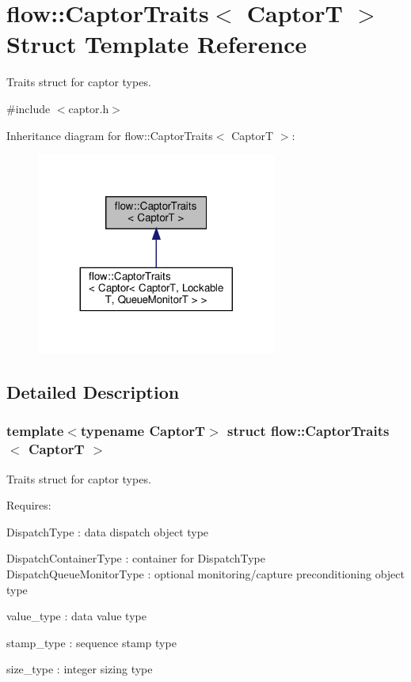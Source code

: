 \hypertarget{structflow_1_1_captor_traits}{}\section{flow\+:\+:Captor\+Traits$<$ CaptorT $>$ Struct Template Reference}
\label{structflow_1_1_captor_traits}


Traits struct for captor types.  




{\ttfamily \#include $<$captor.\+h$>$}



Inheritance diagram for flow\+:\+:Captor\+Traits$<$ CaptorT $>$\+:
\nopagebreak
\begin{figure}[H]
\begin{center}
\leavevmode
\includegraphics[width=224pt]{structflow_1_1_captor_traits__inherit__graph}
\end{center}
\end{figure}


\subsection{Detailed Description}
\subsubsection*{template$<$typename CaptorT$>$\newline
struct flow\+::\+Captor\+Traits$<$ Captor\+T $>$}

Traits struct for captor types. 

Requires\+:
\begin{DoxyItemize}
\item {\ttfamily Dispatch\+Type} \+: data dispatch object type
\item {\ttfamily Dispatch\+Container\+Type} \+: container for {\ttfamily Dispatch\+Type} {\ttfamily Dispatch\+Queue\+Monitor\+Type} \+: optional monitoring/capture preconditioning object type
\item {\ttfamily value\+\_\+type} \+: data value type
\item {\ttfamily stamp\+\_\+type} \+: sequence stamp type
\item {\ttfamily size\+\_\+type} \+: integer sizing type
\end{DoxyItemize}



